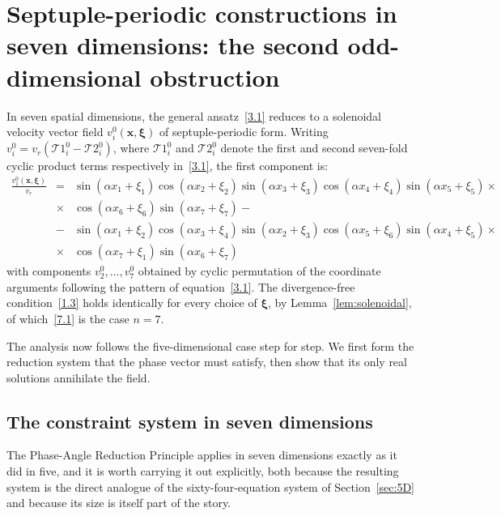 \documentclass[11pt]{jfm}
\numberwithin{equation}{section}
\begin{document}
\section{Septuple-periodic constructions in seven dimensions: the second odd-dimensional obstruction}
\label{sec:7D}
In seven spatial dimensions, the general ansatz~\eqref{3.1} reduces to a solenoidal
velocity vector field $v_i^0(\boldsymbol{x}, \boldsymbol{\xi})$ of septuple-periodic
form. Writing $v_i^0 = v_r(\mathcal{T}1_i^0 - \mathcal{T}2_i^0)$, where $\mathcal{T}1_i^0$ and $\mathcal{T}2_i^0$ denote
the first and second seven-fold cyclic product terms respectively in~\eqref{3.1},
the first component is:
\begin{eqnarray}
\label{7.1}
\frac{v_1^0(\boldsymbol{x}, \boldsymbol{\xi})}{v_r}&=&
\sin(\alpha x_1\!+\!\xi_1)\cos(\alpha x_2\!+\!\xi_2)\sin(\alpha x_3\!+\!\xi_3)
\cos(\alpha x_4\!+\!\xi_4)\sin(\alpha x_5\!+\!\xi_5)\times\nonumber\\
&\times&\cos(\alpha x_6\!+\!\xi_6)\sin(\alpha x_7\!+\!\xi_7)- \nonumber\\
&-&\sin(\alpha x_1\!+\!\xi_2)\cos(\alpha x_3\!+\!\xi_4)\sin(\alpha x_2\!+\!\xi_3)
\cos(\alpha x_5\!+\!\xi_6)\sin(\alpha x_4\!+\!\xi_5)\times\nonumber\\
&\times&
\cos(\alpha x_7\!+\!\xi_1)\sin(\alpha x_6\!+\!\xi_7)
\end{eqnarray}
with components $v_2^0, \ldots, v_7^0$ obtained by cyclic permutation of the
coordinate arguments following the pattern of equation~\eqref{3.1}. The divergence-free
condition~\eqref{1.3} holds identically for every choice of $\boldsymbol{\xi}$, by
Lemma~\ref{lem:solenoidal}, of which~\eqref{7.1} is the case $n=7$.

The analysis now follows the five-dimensional case step for step. We first form the reduction
system that the phase vector must satisfy, then show that its only real solutions annihilate the
field.

\subsection{The constraint system in seven dimensions}
The Phase-Angle Reduction Principle applies in seven dimensions exactly as it did in five, and
it is worth carrying it out explicitly, both because the resulting system is the direct
analogue of the sixty-four-equation system of Section~\ref{sec:5D} and because its size is
itself part of the story.
\end{document}
